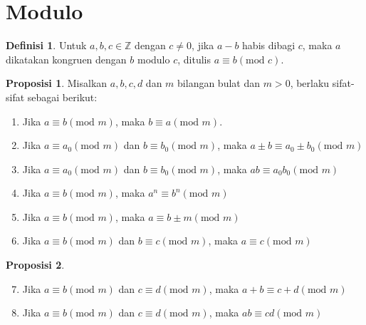 \documentclass[aspectratio=169]{beamer}
\theoremstyle{definition}
\newtheorem{definisi}{Definisi}
\newtheorem{proposisi}{Proposisi}
\begin{document}
\section{Modulo}
\begin{frame}{\insertsection}
  \begin{definisi}
    Untuk $a,b,c \in \mathbb{Z}$ dengan $c\ne 0$, jika $a-b$ habis dibagi $c$, maka $a$ dikatakan kongruen dengan $b$ modulo $c$, ditulis $a \equiv b (\text{mod }c)$.
  \end{definisi}
  \begin{proposisi}
    Misalkan $a,b,c,d$ dan $m$ bilangan bulat dan $m>0$, berlaku sifat-sifat sebagai berikut:
    \begin{enumerate}
      \item Jika $a\equiv b (\text{mod }m)$, maka $b\equiv a (\text{mod }m)$.
      \item Jika $a\equiv a_0 (\text{mod }m)$ dan $b\equiv b_0 (\text{mod }m)$, maka $a \pm b\equiv a_0 \pm b_0 (\text{mod }m)$
      \item Jika $a\equiv a_0 (\text{mod }m)$ dan $b\equiv b_0 (\text{mod }m)$, maka $ab\equiv a_0b_0 (\text{mod }m)$
      \item Jika $a\equiv b (\text{mod }m)$, maka $a^n\equiv b^n (\text{mod }m)$
      \item Jika $a\equiv b (\text{mod }m)$, maka $a\equiv b \pm m (\text{mod }m)$
      \item Jika $a\equiv b (\text{mod }m)$ dan $b\equiv c (\text{mod }m)$, maka $a\equiv c (\text{mod }m)$
    \end{enumerate}
  \end{proposisi}
\end{frame}
\begin{frame}{\insertsection}
  \begin{proposisi}
    \begin{enumerate}
      \setcounter{enumi}{6}
      \item Jika $a\equiv b (\text{mod }m)$ dan $c\equiv d (\text{mod }m)$, maka $a+b\equiv c+d (\text{mod }m)$
      \item Jika $a\equiv b (\text{mod }m)$ dan $c\equiv d (\text{mod }m)$, maka $ab\equiv cd (\text{mod }m)$
    \end{enumerate}
  \end{proposisi}
\end{frame}
\end{document}
